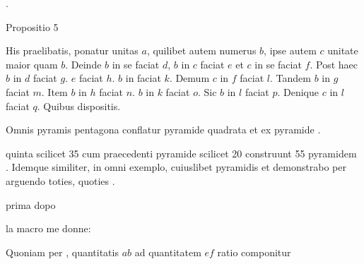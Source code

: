 \documentclass[12pt]{book}
\begin{document}
\par
\Unit {}.
\par
\Prop{}
\begin{Enunciatio}
Propositio 5
\end{Enunciatio}
%
\Unit His praelibatis, ponatur unitas \(a\), quilibet autem
numerus \(b\), ipse autem \(c\) unitate maior quam \(b\).
\Unit Deinde \(b\) in se faciat \(d\), \(b\) in \(c\) faciat
\(e\) et \(c\) in 
se faciat \(f\). 
\Unit Post haec
\(b\) in \(d\) faciat \(g\). 
\(e\) faciat \(h\).
\(b\) in  faciat \(k\). Demum
\(c\) in \(f\) faciat \(l\). 
\Unit Tandem \(b\) in \(g\)
faciat \(m\). Item \(b\) in \(h\) faciat \(n\).
\(b\) in \(k\) faciat \(o\). Sic
\(b\) in \(l\) faciat \(p\). Denique \(c\) in \(l\) faciat
\(q\). Quibus dispositis.
\par
\Unit Omnis pyramis pentagona conflatur
 pyramide quadrata
 et ex pyramide
.
\par
\Unit
{}
quinta \TRN{} scilicet 35 cum praecedenti pyramide
\TRN{} scilicet 20 construunt 55 pyramidem
.
\Unit Idemque similiter, in omni exemplo, cuiuslibet pyramidis
 et
 demonstrabo per
{} arguendo
toties, quoties
.
\par
{}
\par
{}
\par
prima  dopo
\par
{}     
\par
{}
\par
la macro  me donne:
\par
\Unit Quoniam per , quantitatis $ab$ ad quantitatem $ef$ ratio componitur  
\end{document}
